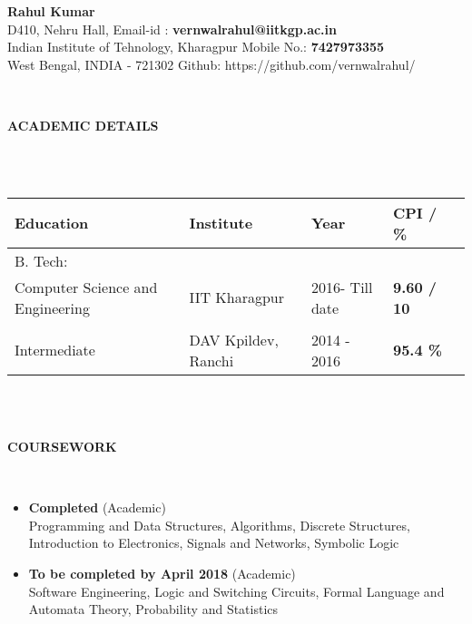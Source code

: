 \documentclass[a4paper,8pt]{article}
\newcommand{\lsep}{-0.5cm}
\newcommand{\resheading}[1]{{\small \colorbox{mygrey}{\begin{minipage}{0.975\textwidth}{\textbf{#1 \vphantom{p\^{E}}}}\end{minipage}}}}
\begin{document}
\begin{center}
\textbf{\Huge Rahul Kumar \\ }  
\indent \hfill \break
\indent D410, Nehru Hall, \hfill Email-id : \textbf{vernwalrahul@iitkgp.ac.in} \\
\indent Indian Institute of Tehnology, Kharagpur \hfill Mobile No.: \textbf{7427973355} \\
\indent West Bengal, INDIA - 721302  \hfill Github: {https://github.com/vernwalrahul/} \\
\end{center}

\hspace{0.5cm}\\[-0.2cm]
\resheading{\textbf{ACADEMIC DETAILS} }\\[\lsep]
\\ 

\indent \begin{tabular}{ l @{\hskip 0.25in} l @{\hskip 0.25in} l @{\hskip 0.25in} l @{\hskip 0.25in} l }
\hline
\textbf{Education} & \textbf{Institute} & \textbf{Year} & \textbf{CPI / \%} \\
\hline
B. Tech:\\
{Computer Science and Engineering} & IIT Kharagpur  & 2016- Till date & \textbf{9.60 / 10} \\ \\
Intermediate & DAV Kpildev, Ranchi & 2014 - 2016 & \textbf{95.4 \%}\\
\hline
\end{tabular}
\\ \hfill \break \\
\resheading{\textbf{ COURSEWORK } }\\[\lsep]
\begin{itemize}
\item \textbf{Completed} (Academic) \\ 
	Programming and Data Structures, Algorithms, Discrete Structures, Introduction to Electronics, Signals and Networks, Symbolic Logic
\item \textbf{To be completed by April 2018} (Academic) \\ 
	Software Engineering, Logic and Switching Circuits, Formal Language and Automata Theory, Probability and Statistics

\end{itemize}
\end{document}
